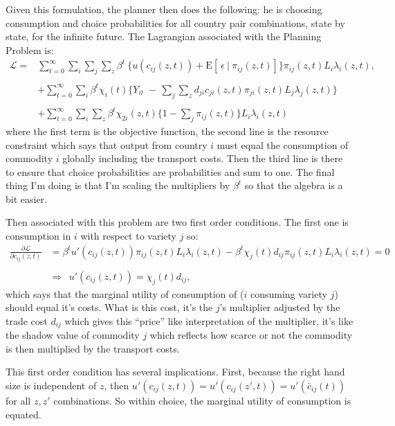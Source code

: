 \documentclass[12pt,pdftex]{article}
\begin{document}
\begin{onehalfspacing}
Given this formulation, the planner then does the following: he is choosing consumption and choice probabilities for all country pair combinations, state by state, for the infinite future. The Lagrangian associated with the Planning Problem is:
\begin{align}
\mathcal{L}  = & \sum_{t=0}^{\infty}   \sum_{i} \sum_{j} \sum\limits_{z} \beta^{t} \  \bigg \{  u(c_{ij}(z, t) ) + \mathrm{E}[ \ \epsilon \ | \ \pi_{ij}(z,t) ] \bigg \}\pi_{ij}(z,t) L_{i} \lambda_{i}(z, t), \\
\nonumber \\
&+ \sum_{t=0}^{\infty} \sum_{i} \beta^{t} \chi_{i}(t) \bigg \{ Y_{it} \  - \ \sum_{j} \sum_{z} d_{ji} c_{ji}(z, t) \pi_{ji}(z,t) L_{j}\lambda_{j}(z, t) \bigg \} \nonumber \\
\nonumber \\
&+ \sum_{t=0}^{\infty} \sum_{i} \sum\limits_{z} \beta^{t} \chi_{2i}(z,t) \bigg \{1 - \sum_{j}\pi_{ij}(z,t) \bigg \} L_{i} \lambda_{i}(z, t) \nonumber
\label{eq:planning-problem}
\end{align}
where the first term is the objective function, the second line is the resource constraint which says that output from country $i$ must equal the consumption of commodity $i$ globally including the transport costs. Then the third line is there to ensure that choice probabilities are probabilities and sum to one. The final thing I'm doing is that I'm scaling the multipliers by $\beta^t$ so that the algebra is a bit easier.

Then associated with this problem are two first order conditions. The first one is consumption in $i$ with respect to variety $j$ so:
\begin{align}
\frac{\partial \mathcal{L} }{\partial c_{ij}(z, t)} &=  \beta^{t} u'(c_{ij}(z, t)) \pi_{ij}(z,t) L_{i} \lambda_{i}(z, t) - \beta^{t} \chi_{j}(t) d_{ij} \pi_{ij}(z,t) L_{i} \lambda_{i}(z, t) = 0 \\
\nonumber \\
& \Rightarrow \ \ u'(c_{ij}(z, t) ) = \chi_{j}(t) d_{ij},
\end{align}
which says that the marginal utility of consumption of ($i$ consuming variety $j$) should equal it's costs. What is this cost, it's the $j$'s multiplier adjusted by the trade cost $d_{ij}$ which gives this ``price'' like interpretation of the multiplier, it's like the shadow value of commodity $j$ which reflects how scarce or not the commodity is then multiplied by the transport costs.

This first order condition has several implications. First, because the right hand size is independent of $z$, then $u'(c_{ij}(z, t)) = u'(c_{ij}(z', t)) = u'(\bar c_{ij}(t))$ for all $z, z'$ combinations. So within choice, the marginal utility of consumption is equated.


\end{onehalfspacing}
\end{document}
